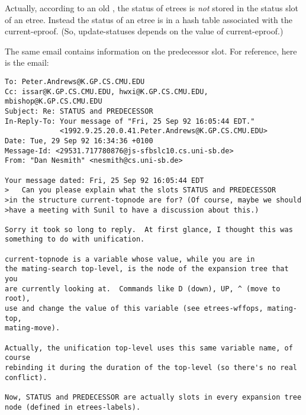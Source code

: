 Actually, according to an old ,
the status of etrees
is {\it not} stored in the status slot of an etree.  Instead the status
of an etree is in a hash table associated with the current-eproof.
(So, update-statuses depends on the value of current-eproof.)

The same email contains information on the predecessor slot.
For reference, here is the email:\label{dans-mail}

\begin{verbatim}
To: Peter.Andrews@K.GP.CS.CMU.EDU
Cc: issar@K.GP.CS.CMU.EDU, hwxi@K.GP.CS.CMU.EDU, mbishop@K.GP.CS.CMU.EDU
Subject: Re: STATUS and PREDECESSOR 
In-Reply-To: Your message of "Fri, 25 Sep 92 16:05:44 EDT."
             <1992.9.25.20.0.41.Peter.Andrews@K.GP.CS.CMU.EDU> 
Date: Tue, 29 Sep 92 16:34:36 +0100
Message-Id: <29531.717780876@js-sfbslc10.cs.uni-sb.de>
From: "Dan Nesmith" <nesmith@cs.uni-sb.de>

Your message dated: Fri, 25 Sep 92 16:05:44 EDT
>	Can you please explain what the slots STATUS and PREDECESSOR
>in the structure current-topnode are for? (Of course, maybe we should
>have a meeting with Sunil to have a discussion about this.)

Sorry it took so long to reply.  At first glance, I thought this was
something to do with unification.

current-topnode is a variable whose value, while you are in
the mating-search top-level, is the node of the expansion tree that you
are currently looking at.  Commands like D (down), UP, ^ (move to root),
use and change the value of this variable (see etrees-wffops, mating-top, 
mating-move).  

Actually, the unification top-level uses this same variable name, of course
rebinding it during the duration of the top-level (so there's no real
conflict).

Now, STATUS and PREDECESSOR are actually slots in every expansion tree
node (defined in etrees-labels).  


\end{verbatim}
